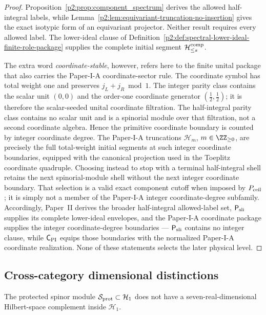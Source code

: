 \documentclass[11pt,a4paper]{article}
\begin{document}
\begin{proof}
Proposition~\ref{p2:prop:component_spectrum} derives the allowed
half-integral labels, while
Lemma~\ref{p2:lem:equivariant-truncation-no-insertion} gives the exact
isotypic form of an equivariant projector.  Neither result requires every
allowed label.  The lower-ideal clause of
Definition~\ref{p2:def:spectral-lower-ideal-finite-role-package} supplies the
complete initial segment \(\mathcal H_{\le s}^{\rm comp}\).

The extra word \emph{coordinate-stable}, however, refers here to the finite unital
package that also carries the Paper-I-A coordinate-sector rule.  The coordinate
symbol has total weight one and preserves \(j_L+j_R\bmod1\).  The integer parity
class contains the scalar unit \((0,0)\) and the order-one coordinate generator
\((\tfrac12,\tfrac12)\); it is therefore the scalar-seeded unital coordinate
filtration.  The half-integral parity class contains no scalar unit and is a
spinorial module over that filtration, not a second coordinate algebra.  Hence
the primitive coordinate boundary is counted by integer coordinate degree.  The Paper-I-A truncations
\(\mathcal H_m\), \(m\in\ZZ_{\ge0}\), are precisely the full total-weight initial
segments at such integer coordinate boundaries, equipped with the canonical
projection used in the Toeplitz coordinate quadruple.  Choosing instead to
stop with a terminal half-integral shell retains the next spinorial-module
shell without the next integer coordinate boundary.  That selection is a valid
exact component cutoff when imposed by \(P_{\rm ceil}\); it is simply not a member of
the Paper-I-A integer coordinate-degree subfamily.  Accordingly, Paper~II
derives the broader half-integral allowed-label set,
\(\mathsf P_{\rm sli}\) supplies its complete lower-ideal envelopes, and the
Paper-I-A coordinate package supplies the integer coordinate-degree boundaries
--- \(\mathsf P_{\rm sli}\) contains no integer clause, while \(\mathsf C_{\rm PI}\) equips
those boundaries with the normalized Paper-I-A coordinate realization.  None
of these statements selects the later physical level.
\end{proof}

\subsection{Cross-category dimensional distinctions}
\label{p2b:app:cross-category-caveat}
\begin{lemma}
\label{p2:lem:no-literal-seven-hilbert-complement}
The protected spinor module $\mathcal S_{\rm prot}\subset\mathcal H_1$ does not have a seven-real-dimensional Hilbert-space complement inside $\mathcal H_1$.
\end{lemma}
\end{document}
